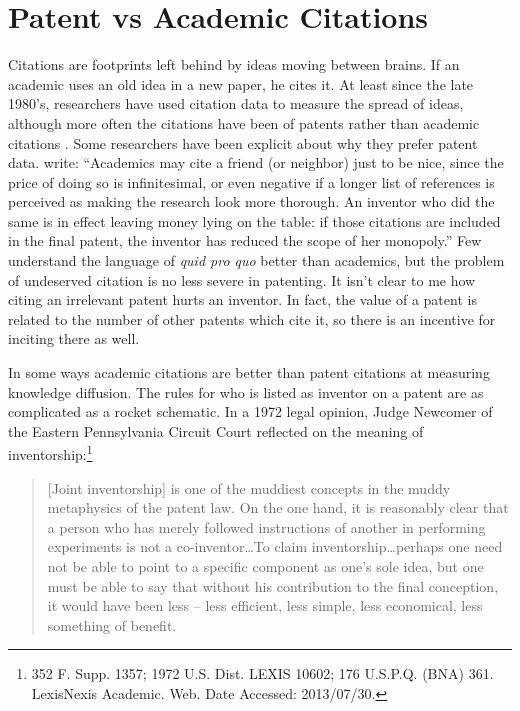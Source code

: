 \section{Patent vs Academic Citations}

Citations are footprints left behind by ideas moving between brains. If
an academic uses an old idea in a new paper, he cites it. At least since
the late 1980's, researchers have used citation data to measure the
spread of ideas, although more often the citations have been of patents
rather than academic citations \citep{griliches1998patent}. Some
researchers have been explicit about why they prefer patent data.
\citep{jaffe2002patents} write: ``Academics may cite a friend (or
neighbor) just to be nice, since the price of doing so is infinitesimal,
or even negative if a longer list of references is perceived as making
the research look more thorough. An inventor who did the same is in
effect leaving money lying on the table: if those citations are included
in the final patent, the inventor has reduced the scope of her
monopoly.'' Few understand the language of \emph{quid pro quo} better
than academics, but the problem of undeserved citation is no less severe
in patenting. It isn't clear to me how citing an irrelevant patent hurts
an inventor. In fact, the value of a patent is related to the number of
other patents which cite it, so there is an incentive for inciting there
as well.

In some ways academic citations are better than patent citations at
measuring knowledge diffusion. The rules for who is listed as inventor
on a patent are as complicated as a rocket schematic. In a 1972 legal
opinion, Judge Newcomer of the Eastern Pennsylvania Circuit Court
reflected on the meaning of
inventorship:\footnote{352 F. Supp. 1357; 1972 U.S. Dist. LEXIS 10602; 176 U.S.P.Q. (BNA) 361. LexisNexis Academic. Web. Date Accessed: 2013/07/30.}

\begin{quote}
{[}Joint inventorship{]} is one of the muddiest concepts in the muddy
metaphysics of the patent law. On the one hand, it is reasonably clear
that a person who has merely followed instructions of another in
performing experiments is not a co-inventor\ldots{}To claim
inventorship\ldots perhaps one need not be able to point to a specific
component as one's sole idea, but one must be able to say that without
his contribution to the final conception, it would have been less --
less efficient, less simple, less economical, less something of benefit.
\end{quote}

